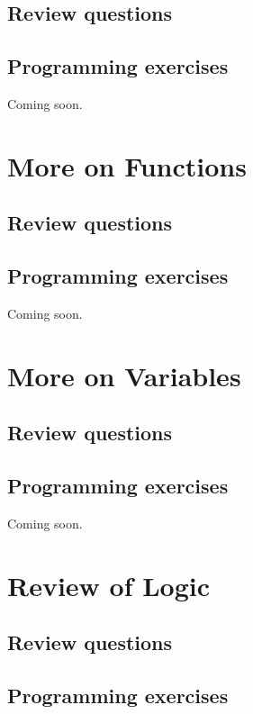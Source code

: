 \documentclass[article,A4,12pt]{llncs}
\begin{document}
\subsection{Review questions}

\subsection{Programming exercises}

Coming soon.


\section{More on Functions}

\subsection{Review questions}

\subsection{Programming exercises}

Coming soon.


\section{More on Variables}

\subsection{Review questions}

\subsection{Programming exercises}

Coming soon.


\section{Review of Logic}

\subsection{Review questions}

\subsection{Programming exercises}
\end{document}
